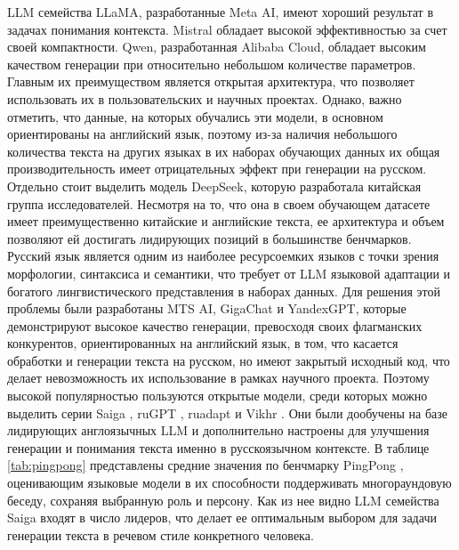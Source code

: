 LLM семейства LLaMA, разработанные Meta AI, имеют хороший результат в задачах понимания контекста. Mistral обладает высокой эффективностью за счет своей компактности. Qwen, разработанная Alibaba Cloud, обладает высоким качеством генерации при относительно небольшом количестве параметров. Главным их преимуществом является открытая архитектура, что позволяет использовать их в пользовательских и научных проектах. Однако, важно отметить, что данные, на которых обучались эти модели, в основном ориентированы на английский язык, поэтому из-за наличия небольшого количества текста на других языках в их наборах обучающих данных их общая производительность имеет отрицательных эффект при генерации на русском.
Отдельно стоит выделить модель DeepSeek, которую разработала китайская группа исследователей. Несмотря на то, что она в своем обучающем датасете имеет преимущественно китайские и английские текста, ее архитектура и объем позволяют ей достигать лидирующих позиций в большинстве бенчмарков.
Русский язык является одним из наиболее ресурсоемких языков с точки зрения морфологии, синтаксиса и семантики, что требует от LLM языковой адаптации и богатого лингвистического представления в наборах данных. Для решения этой проблемы были разработаны MTS AI, GigaChat и YandexGPT, которые демонстрируют высокое качество генерации, превосходя своих флагманских конкурентов,
ориентированных на английский язык, в том, что касается обработки и генерации текста на русском, но имеют закрытый исходный код, что делает невозможность их использование в рамках научного проекта. Поэтому высокой популярностью пользуются открытые модели, среди которых можно выделить серии Saiga \cite{Gusev2025RULM}, ruGPT \cite{Zmitrovich2023RussianLMs}, ruadapt \cite{Tikhomirov2024LEP} и Vikhr \cite{Nikolich2024Vikhr}. Они были дообучены на базе лидирующих англоязычных LLM и дополнительно настроены для улучшения генерации и понимания текста именно в русскоязычном контексте.
В таблице \ref{tab:pingpong} представлены средние значения по бенчмарку PingPong \cite{Gusev2025PingPong}, оценивающим языковые модели в их способности поддерживать многораундовую беседу, сохраняя выбранную роль и персону. Как из нее видно LLM семейства Saiga входят в число лидеров, что делает ее оптимальным выбором для задачи генерации текста в речевом стиле конкретного человека.


